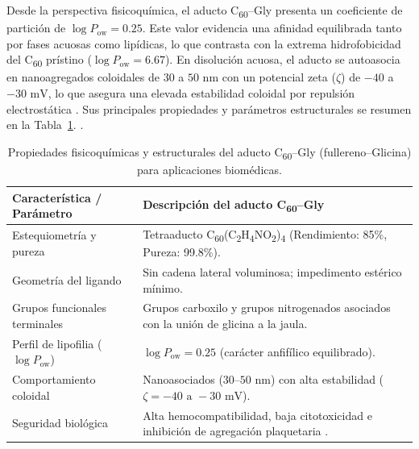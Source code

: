 Desde la perspectiva fisicoquímica, el aducto C\textsubscript{60}--Gly presenta un coeficiente de partición de $\log P_{\text{ow}} = 0.25$. Este valor evidencia una afinidad equilibrada tanto por fases acuosas como lipídicas, lo que contrasta con la extrema hidrofobicidad del C\textsubscript{60} prístino ($\log P_{\text{ow}} = 6.67$). %
 En disolución acuosa, el aducto se autoasocia en nanoagregados coloidales de 30 a $50\text{ nm}$ con un potencial zeta ($\zeta$) de $-40$ a $-30\text{ mV}$, lo que asegura una elevada estabilidad coloidal por repulsión electrostática \cite{sharoyko2024modification}. Sus principales propiedades y parámetros estructurales se resumen en la Tabla~\ref{tab:aplicaciones_fullereno}. \cite{nakamura2012water,jiang2015synthesis,sharoyko2024modification}.

\begin{table}[H]
\centering
\caption{Propiedades fisicoquímicas y estructurales del aducto C\textsubscript{60}--Gly (fullereno--Glicina) para aplicaciones biomédicas.}
\label{tab:aplicaciones_fullereno}
\begin{tabular}{l p{10cm}}
\toprule
\textbf{Característica / Parámetro} & \textbf{Descripción del aducto C\textsubscript{60}--Gly} \\
\midrule
Estequiometría y pureza & Tetraaducto C\textsubscript{60}(C\textsubscript{2}H\textsubscript{4}NO\textsubscript{2})\textsubscript{4} (Rendimiento: 85\%, Pureza: 99.8\%).\\
Geometría del ligando & Sin cadena lateral voluminosa; impedimento estérico mínimo. \\
Grupos funcionales terminales & Grupos carboxilo y grupos nitrogenados asociados con la unión de glicina a la jaula. \\
Perfil de lipofilia ($\log P_{\text{ow}}$) & $\log P_{\text{ow}} = 0.25$ (carácter anfifílico equilibrado). \\
Comportamiento coloidal & Nanoasociados ($30\text{--}50\text{ nm}$) con alta estabilidad ($\zeta = -40\text{ a }-30\text{ mV}$). \\
Seguridad biológica & Alta hemocompatibilidad, baja citotoxicidad e inhibición de agregación plaquetaria  \cite{sharoyko2024modification}. \\
\bottomrule
\end{tabular}
\end{table}


